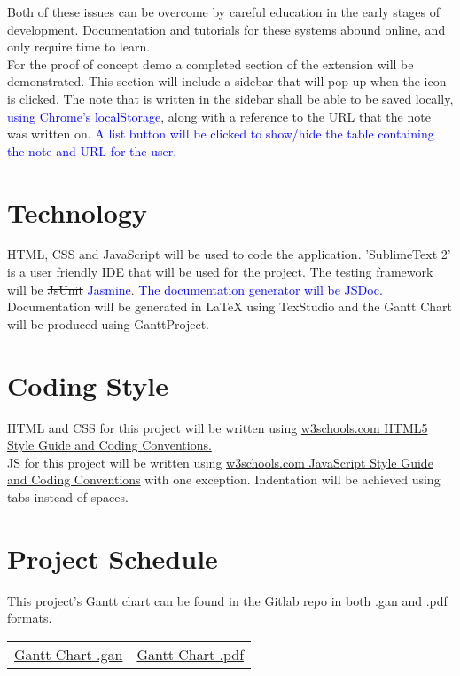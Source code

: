 \documentclass{article}
\begin{document}
	Both of these issues can be overcome by careful education in the early 
	stages of development. Documentation and tutorials for these systems abound 
	online, and only require time to learn.\\
	
	For the proof of concept demo a completed section of the extension will be 
	demonstrated. This section will include a sidebar that will pop-up when the icon is 
	clicked. The note that is written in the sidebar shall be able to be saved locally, 
	\textcolor{blue}{using Chrome's localStorage}, along with a reference to the URL that 
	the note was written on. \textcolor{blue}{A list button will be clicked to show/hide the 
	table containing the note and URL for the user.}
	\section{Technology}
	
	HTML, CSS and JavaScript will be used to code the application. 'SublimeText 
	2' is a user 
	friendly
	IDE that will be used for the project. The testing framework will be 
	\sout{JsUnit} \textcolor{blue}{Jasmine}. \textcolor{blue}{The documentation generator 
	will be JSDoc.}
	Documentation will be generated in LaTeX using TexStudio and 
	the Gantt Chart will be produced using GanttProject.
	
	\section{Coding Style}
	
	HTML and CSS for this project will be written using 
	\href{http://www.w3schools.com/html/html5_syntax.asp}
	{w3schools.com HTML5 Style Guide and Coding Conventions.}\\
	
	JS for this project will be written using 
	\href{http://www.w3schools.com/js/js_conventions.asp}
	{w3schools.com JavaScript Style Guide and Coding Conventions} with one 
	exception. Indentation will be achieved using tabs instead of spaces.
	
	\section{Project Schedule}
	 This project's Gantt chart can be found in the Gitlab repo in both .gan 
	 and .pdf formats.
		\begin{table}[H]
			\begin{tabularx}{\textwidth}{cc}		
				\href{https://gitlab.cas.mcmaster.ca/macsidenotes/macsidenotes/blob/master/ProjectSchedule/MacSidenotesProjectSchedule.gan}
				{Gantt Chart .gan} & 
				\href{https://gitlab.cas.mcmaster.ca/macsidenotes/macsidenotes/blob/master/ProjectSchedule/MacSidenotesProjectSchedule.pdf}
				{Gantt Chart .pdf}
			\end{tabularx}
		\end{table}
	
\end{document}
